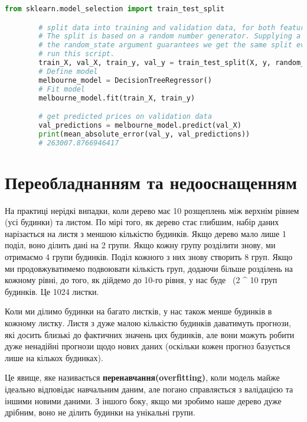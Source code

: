 \begin{lstlisting}[style=light, language=Python,label={lst:vectorimg},caption=The mean absolute error calculcation]
        from sklearn.model_selection import train_test_split

        # split data into training and validation data, for both features and target
        # The split is based on a random number generator. Supplying a numeric value to
        # the random_state argument guarantees we get the same split every time we
        # run this script.
        train_X, val_X, train_y, val_y = train_test_split(X, y, random_state = 0)
        # Define model
        melbourne_model = DecisionTreeRegressor()
        # Fit model
        melbourne_model.fit(train_X, train_y)

        # get predicted prices on validation data
        val_predictions = melbourne_model.predict(val_X)
        print(mean_absolute_error(val_y, val_predictions))
        # 263007.8766946417
\end{lstlisting}

\section{Переобладнанням та недооснащенням}\label{sec:underfitting_overfitting}
На практиці нерідкі випадки, коли дерево має 10 розщеплень між верхнім рівнем (усі будинки) та листом.
По мірі того, як дерево стає глибшим, набір даних нарізається на листя з меншою кількістю будинків.
Якщо дерево мало лише 1 поділ, воно ділить дані на 2 групи.
Якщо кожну групу розділити знову, ми отримаємо 4 групи будинків.
Поділ кожного з них знову створить 8 груп.
Якщо ми продовжуватимемо подвоювати кількість груп, додаючи більше розділень на кожному рівні, до того, як дійдемо до 10-го рівня, у нас буде \ (2 ^ 10 \) груп будинків.
Це 1024 листки.

Коли ми ділимо будинки на багато листків, у нас також менше будинків в кожному листку.
Листя з дуже малою кількістю будинків даватимуть прогнози, які досить близькі до фактичних значень цих будинків, але вони можуть робити дуже ненадійні прогнози щодо нових даних (оскільки кожен прогноз базується лише на кількох будинках).

Це явище, яке називається \textbf{перенавчання(overfitting)}, коли модель майже ідеально відповідає навчальним даним, але погано справляється з валідацією та іншими новими даними.
З іншого боку, якщо ми зробимо наше дерево дуже дрібним, воно не ділить будинки на унікальні групи.

